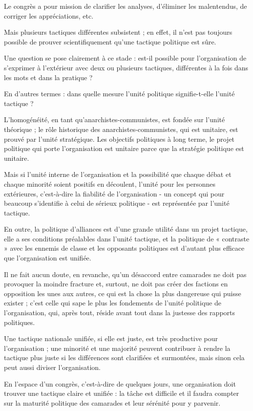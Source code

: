 Le congrès a pour mission de clarifier les analyses, d'éliminer les malentendus, de corriger les appréciations, etc.

Mais plusieurs tactiques différentes subsistent ; en effet, il n'est pas toujours possible de prouver scientifiquement qu'une tactique politique est sûre.

Une question se pose clairement à ce stade : est-il possible pour l'organisation de s'exprimer à l'extérieur avec deux ou plusieurs tactiques, différentes à la fois dans les mots et dans la pratique ?

En d'autres termes : dans quelle mesure l'unité politique signifie-t-elle l'unité tactique ?

L'homogénéité, en tant qu'anarchistes-communistes, est fondée sur l'unité théorique ; le rôle historique des anarchistes-communistes, qui est unitaire, est prouvé par l'unité stratégique. Les objectifs politiques à long terme, le projet politique qui porte l'organisation est unitaire parce que la stratégie politique est unitaire.

Mais si l'unité interne de l'organisation et la possibilité que chaque débat et chaque minorité soient positifs en découlent, l'unité pour les personnes extérieures, c'est-à-dire la fiabilité de  l'organisation - un concept qui pour beaucoup s'identifie à celui de sérieux politique - est représentée par l'unité tactique.

En outre, la politique d'alliances est d'une grande utilité dans un projet tactique, elle a ses conditions préalables dans l'unité tactique, et la politique de « contraste » avec les ennemis de classe et les opposants politiques est d'autant plus efficace que l'organisation est unifiée.

Il ne fait aucun doute, en revanche, qu'un désaccord entre camarades ne doit pas provoquer la moindre fracture et, surtout, ne doit pas créer des factions en opposition les unes aux autres, ce qui est la chose la plus dangereuse qui puisse exister ; c'est celle qui sape le plus les fondements de l'unité politique de l'organisation, qui, après tout, réside avant tout dans la justesse des rapports politiques.

Une tactique nationale unifiée, si elle est juste, est très productive pour l'organisation ; une minorité et une majorité peuvent contribuer à rendre la tactique plus juste si les différences sont clarifiées et surmontées, mais sinon cela peut aussi diviser l'organisation.

En l'espace d'un congrès, c'est-à-dire de quelques jours, une organisation doit trouver une tactique claire et unifiée : la tâche est difficile et il faudra compter sur la maturité politique des camarades et leur sérénité pour y parvenir.

